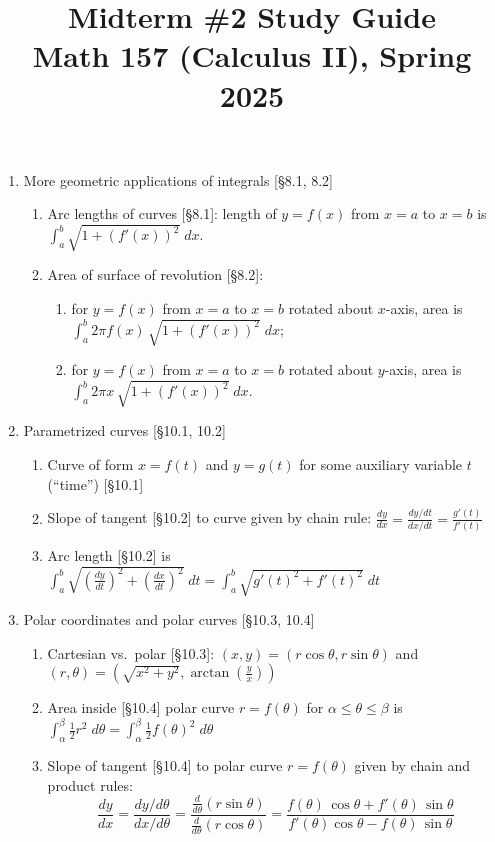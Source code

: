 \documentclass[11pt]{article}
\title{Midterm \#2 Study Guide \\ Math 157 (Calculus II), Spring 2025}
\date{}
\begin{document}
\maketitle

\thispagestyle{empty}

\vspace{-2cm}

\begin{enumerate}
\item More geometric applications of integrals [\S8.1, 8.2]
\begin{enumerate}
\item Arc lengths of curves [\S8.1]: length of $y=f(x)$ from $x=a$ to $x=b$ is $\int_{a}^{b} \sqrt{1+(f'(x))^2} \; dx$.
\item Area of surface of revolution [\S8.2]: 
\begin{enumerate}
\item for $y=f(x)$ from $x=a$ to $x=b$ rotated about $x$-axis, area is $\int_{a}^{b} 2\pi f(x) \, \sqrt{1+(f'(x))^2} \; dx$;
\item for $y=f(x)$ from $x=a$ to $x=b$ rotated about $y$-axis, area is $\int_{a}^{b} 2\pi x \, \sqrt{1+(f'(x))^2} \; dx$.
\end{enumerate}
\end{enumerate}

\item Parametrized curves [\S10.1, 10.2]
\begin{enumerate}
\item Curve of form $x=f(t)$ and $y=g(t)$ for some auxiliary variable $t$ (``time'') [\S10.1]
\item Slope of tangent [\S10.2] to curve given by chain rule: $\frac{dy}{dx} = \frac{dy/dt}{dx/dt} = \frac{g'(t)}{f'(t)}$ 
\item Arc length [\S10.2] is $\int_{a}^{b} \sqrt{(\frac{dy}{dt})^2 + (\frac{dx}{dt})^2} \; dt = \int_{a}^{b} \sqrt{g'(t)^2 + f'(t)^2} \; dt$
\end{enumerate}

\item Polar coordinates and polar curves [\S10.3, 10.4]
\begin{enumerate}
\item Cartesian vs.~polar [\S10.3]: $(x,y) = (r\cos \theta, r \sin \theta)$ and $(r,\theta) = (\sqrt{x^2+y^2}, \arctan (\frac{y}{x}))$
\item Area inside [\S10.4] polar curve $r=f(\theta)$ for $\alpha \leq \theta \leq \beta$ is $\int_{\alpha}^{\beta} \frac{1}{2} r^2 \; d\theta=\int_{\alpha}^{\beta} \frac{1}{2} f(\theta)^2 \; d\theta$ 
\item Slope of tangent [\S10.4] to polar curve $r=f(\theta)$ given by chain and product rules: 
{\small \[\frac{dy}{dx} = \frac{dy/d\theta}{dx/d\theta} = \frac{\frac{d}{d\theta}(r \sin\theta)}{\frac{d}{d\theta}(r \cos\theta)} = \frac{f(\theta)\, \cos \theta  + f'(\theta) \, \sin \theta}{f'(\theta)\cos\theta-f(\theta)\, \sin\theta }\]}
\end{enumerate}

\end{enumerate}
\end{document}
